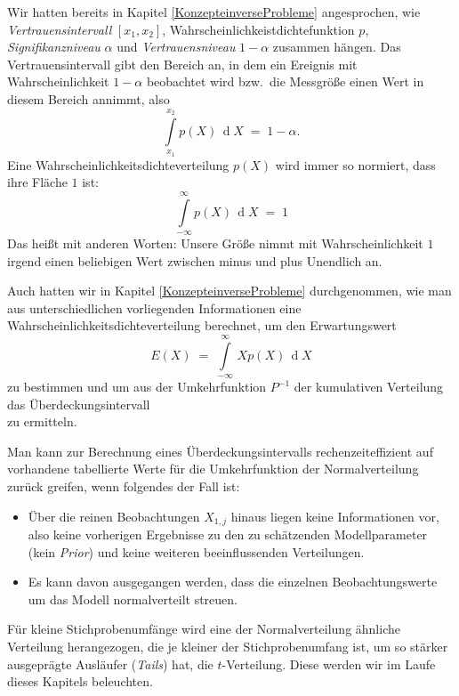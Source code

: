 Wir hatten bereits in Kapitel \ref{KonzepteinverseProbleme} angesprochen, wie
\textsl{Vertrauensintervall} $[x_1, x_2]$, Wahrscheinlichkeistdichtefunktion $p$,
\textsl{Signifikanzniveau} $\alpha$ und \textsl{Vertrauensniveau} $1-\alpha$ zusammen hängen.
Das Vertrauensintervall gibt den Bereich an, in dem ein Ereignis mit
Wahrscheinlichkeit $1-\alpha$ beobachtet wird bzw.\ die Messgröße einen Wert in diesem Bereich
annimmt, also
\begin{equation}
\int\limits_{x_1}^{x_2} p(X) \, \operatorname{d} X \; = \; 1 - \alpha .
\end{equation}
Eine Wahrscheinlichkeitsdichteverteilung $p(X)$
wird immer so normiert, dass ihre Fläche $1$ ist:
\begin{equation}
\int\limits_{-\infty}^\infty p(X) \, \operatorname{d} X \; = \; 1
\end{equation}
Das heißt mit anderen Worten:
Unsere Größe nimmt mit Wahrscheinlichkeit $1$ irgend einen beliebigen
Wert zwischen minus und plus Unendlich an.

Auch hatten wir in Kapitel \ref{KonzepteinverseProbleme} durchgenommen, wie man aus unterschiedlichen vorliegenden
Informationen eine Wahrscheinlichkeitsdichteverteilung berechnet, um den
Erwartungswert
\begin{equation}
E(X) \; = \; \int\limits_{-\infty}^\infty \, X  p(X) \, \operatorname{d} X
\end{equation}
zu bestimmen und um aus der Umkehrfunktion $P^{-1}$ der kumulativen Verteilung
das Über\-deck\-ungs\-intervall
\begin{equation}
[P^{-1}(\frac{\alpha}{2}), P^{-1}(1-\frac{\alpha}{2})]
\end{equation}
zu ermitteln.

Man kann zur Berechnung eines Überdeckungsintervalls
rechenzeiteffizient auf vorhandene tabellierte Werte für
die Umkehrfunktion der Normalverteilung zurück greifen, wenn
folgendes der Fall ist:
\begin{itemize}
\item Über die reinen Beobachtungen $X_{1,j}$ hinaus liegen keine
Informationen vor, also keine vorherigen Ergebnisse zu den zu
schätzenden Modellparameter (kein \textsl{Prior})
und keine weiteren beeinflussenden Verteilungen.
\item Es kann davon ausgegangen werden, dass die
einzelnen Beobachtungswerte um das Modell
normalverteilt streuen.
\end{itemize}
Für kleine
Stichprobenumfänge wird eine der Normalverteilung ähnliche Verteilung
herangezogen, die je kleiner der Stichprobenumfang ist, um so stärker ausgeprägte
Ausläufer (\textsl{Tails}) hat, die $t$-Verteilung. Diese werden wir im Laufe
dieses Kapitels beleuchten.

